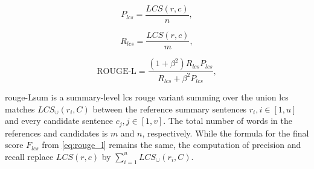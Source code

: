 \begin{equation}
P_{lcs} = \frac{LCS(r,c)}{n},
\label{eq:rouge_l_precision}
\end{equation}

\begin{equation}
R_{lcs} = \frac{LCS(r,c)}{m},
\label{eq:rouge_l_recall}
\end{equation}

\begin{equation}
\text{ROUGE-L} = \frac{(1 + \beta^2)R_{lcs}P_{lcs}}{R_{lcs} + \beta^2 P_{lcs}},
\label{eq:rouge_l}
\end{equation}

\ac{rouge}-Lsum is a summary-level \ac{lcs} \ac{rouge} variant summing over the union \ac{lcs} matches $LCS_\cup(r_i,C)$ between the reference summary sentences $r_i, i \in [1,u]$ and every candidate sentence $c_j, j \in [1,v]$.
The total number of words in the references and candidates is $m$ and $n$, respectively.
While the formula for the final score $F_{lcs}$ from \autoref{eq:rouge_l} remains the same, the computation of precision and recall replace $LCS(r,c)$ by $\sum_{i=1}^{u}LCS_\cup(r_i,C)$.
